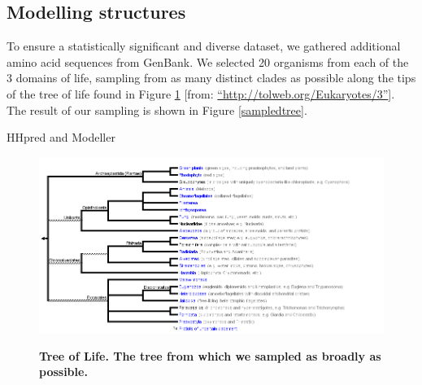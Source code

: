 \documentclass[10pt,letterpaper]{article}
\begin{document}
\subsection*{Modelling structures}
To ensure a statistically significant and diverse dataset, we gathered additional amino acid sequences from GenBank.  
We selected 20 organisms from each of the 3 domains of life, sampling from as many distinct clades as possible along the tips of the tree of life found in Figure \ref{treeoflife} [from: \hyperref[label_name]{``http://tolweb.org/Eukaryotes/3''}]. 
The result of our sampling is shown in Figure \ref{sampledtree}.

HHpred and Modeller


\begin{figure}
  \caption{\bf Tree of Life.  The tree from which we sampled as broadly as possible.}
  \centering
    \includegraphics[width=\textwidth]{Eukaryotes.png}
  \label{treeoflife}  
\end{figure}
\end{document}
